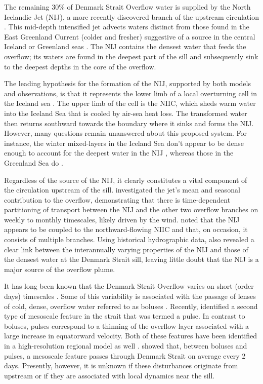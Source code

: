 \documentclass[12pt,titlepage,figuresatend]{article}
\begin{document}
The remaining 30\% of Denmark Strait Overflow water is supplied by the North Icelandic Jet (NIJ), a more recently discovered branch of the upstream circulation \cite[]{Steingrimur2004,Vage2011}. This mid-depth intensified jet advects waters distinct from those found in the East Greenland Current (colder and fresher) suggestive of a source in the central Iceland or Greenland seas \cite[]{Vage2011,Vage2015,Harden2016}. The NIJ contains the densest water that feeds the overflow; its waters are found in the deepest part of the sill \cite[]{Mastropole2017} and subsequently sink to the deepest depths in the core of the overflow.

The leading hypothesis for the formation of the NIJ, supported by both models and observations, is that it represents the lower limb of a local overturning cell in the Iceland sea \cite[]{Vage2011,Behrens2017}. The upper limb of the cell is the NIIC, which sheds warm water into the Iceland Sea that is cooled by air-sea heat loss. The transformed water then returns southward towards the boundary where it sinks and forms the NIJ. However, many questions remain unanswered about this proposed system. For instance, the winter mixed-layers in the Iceland Sea don't appear to be dense enough to account for the deepest water in the NIJ \cite[]{Vage2015}, whereas those in the Greenland Sea do \cite[]{Strass1993,Rudels2002}.

Regardless of the source of the NIJ, it clearly constitutes a vital component of the circulation upstream of the sill. \cite[]{Harden2016} investigated the jet's mean and seasonal contribution to the overflow, demonstrating that there is time-dependent partitioning of transport between the NIJ and the other two overflow branches on weekly to monthly timescales, likely driven by the wind. \cite{Pickart2017} noted that the NIJ appears to be coupled to the northward-flowing NIIC and that, on occasion, it consists of multiple branches. Using historical hydrographic data, \cite{Pickart2017} also revealed a clear link between the interannually varying properties of the NIJ and those of the densest water at the Denmark Strait sill, leaving little doubt that the NIJ is a major source of the overflow plume. 

It has long been known that the Denmark Strait Overflow varies on short (order days) timescales \cite[]{Smith1976,Bruce1995,Kase2003}. Some of this variability is associated with the passage of lenses of cold, dense, overflow water referred to as boluses \cite[]{Cooper1955}. Recently, \cite{Appen2017} identified a second type of mesoscale feature in the strait that was termed a pulse. In contrast to boluses, pulses correspond to a thinning of the overflow layer associated with a large increase in equatorward velocity. Both of these features have been identified in a high-resolution regional model as well \cite[]{Almansi2017}. \cite{Appen2017} showed that, between boluses and pulses, a mesoscale feature passes through Denmark Strait on average every 2 days. Presently, however, it is unknown if these disturbances originate from upstream or if they are associated with local dynamics near the sill. 
\end{document}
